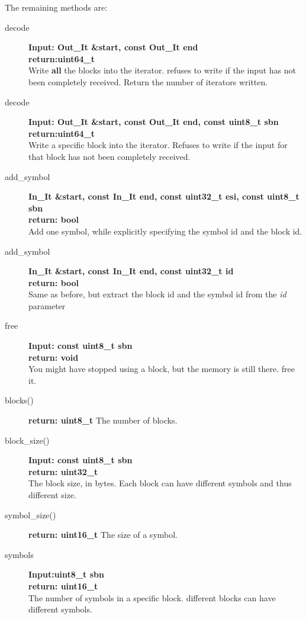 \documentclass[11pt,a4paper]{refart}
\begin{document}
The remaining methods are:
\begin{description}
\item[decode]\textbf{Input: Out\_It \&start, const Out\_It end}\\
\textbf{return:uint64\_t}\\
Write \textbf{all} the blocks into the iterator. refuses to write if the input has not been completely received. Return the number of iterators written.

\item[decode]\textbf{Input: Out\_It \&start, const Out\_It end, const uint8\_t sbn}\\
\textbf{return:uint64\_t}\\
Write a specific block into the iterator. Refuses to write if the input for that block has not been completely received.

\item[add\_symbol]\textbf{In\_It \&start, const In\_It end, const uint32\_t esi, const uint8\_t sbn}\\
\textbf{return: bool}\\
Add one symbol, while explicitly specifying the symbol id and the block id.

\item[add\_symbol]\textbf{In\_It \&start, const In\_It end, const uint32\_t id}\\
\textbf{return: bool}\\
Same as before, but extract the block id and the symbol id from the \textit{id} parameter

\item[free]\textbf{Input: const uint8\_t sbn}\\
\textbf{return: void}\\
You might have stopped using a block, but the memory is still there. free it.

\item[blocks()] \textbf{return: uint8\_t} The number of blocks.

\item[block\_size()] \textbf{Input: const uint8\_t sbn}\\
\textbf{return: uint32\_t}\\
The block size, in bytes. Each block can have different symbols and thus different size.

\item[symbol\_size()] \textbf{return: uint16\_t} The size of a symbol.

\item[symbols] \textbf{Input:uint8\_t sbn}\\
\textbf{return: uint16\_t}\\
The number of symbols in a specific block. different blocks can have different symbols.
\end{description}
\end{document}
